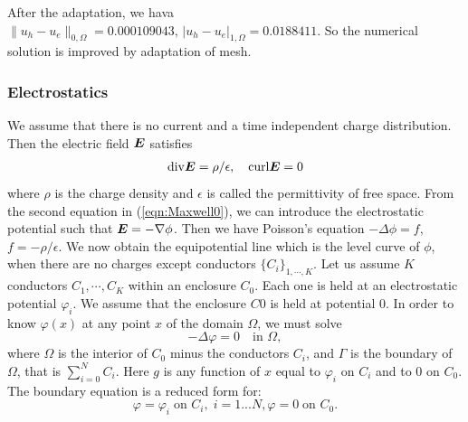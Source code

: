 \documentclass[a4paper,twoside,12pt]{book}
\def\vec#1{\mbox{\boldmath $#1$}}
\begin{document}
After the adaptation, we hava
$\|u_h - u_e\|_{0,\Omega}=0.000109043,\, |u_h - u_e|_{1,\Omega}=0.0188411$.
So the numerical solution is improved by adaptation of mesh.


\subsubsection{Electrostatics}
We assume that there is no current and a time independent charge distribution.
Then the electric field $\vec E$ satisfies
\begin{eqnarray}
\label{eqn:Maxwell0}
\mathrm{div}\vec E=\rho/\epsilon,\quad \mathrm{curl}\vec E=0
\end{eqnarray}
where $\rho$ is the charge density and $\epsilon$ is called the permittivity of free space. From the second equation in (\ref{eqn:Maxwell0}), we can introduce
the electrostatic potential such that $\vec E=-\nabla \phi$.
Then we have Poisson's equation $-\Delta \phi=f$, $f=-\rho/\epsilon$.
We now obtain the equipotential line which is the level curve of $\phi$,
when there are no charges except conductors $\{C_i\}_{1,\cdots,K}$.
Let us assume $K$ conductors $C_1,\cdots,C_K$ within an enclosure $C_0$.
Each one is held
at an electrostatic potential $\varphi_i$. We assume that the enclosure $C0$ is
held at
potential 0.
In order to know $\varphi(x)$ at any point $x$ of the domain $\Omega$, we must
solve
\begin{equation}
-\Delta \varphi =0\quad \textrm{in  }\Omega ,
\end{equation}
where $\Omega$ is the interior of $C_0$ minus the conductors $C_i$, and
$\Gamma$ is the boundary of $\Omega$, that is $\sum_{i=0}^N C_i$.
Here $g$ is any function of $x$ equal to $\varphi_i$ on $C_i$ and to
0 on $C_0$. The boundary equation is a reduced form for:
\begin{equation}
\varphi =\varphi _{i}\;\text{on }C_{i},\;i=1...N,\varphi =0\;\text{on\ }%
C_{0}.
\end{equation}
\end{document}

